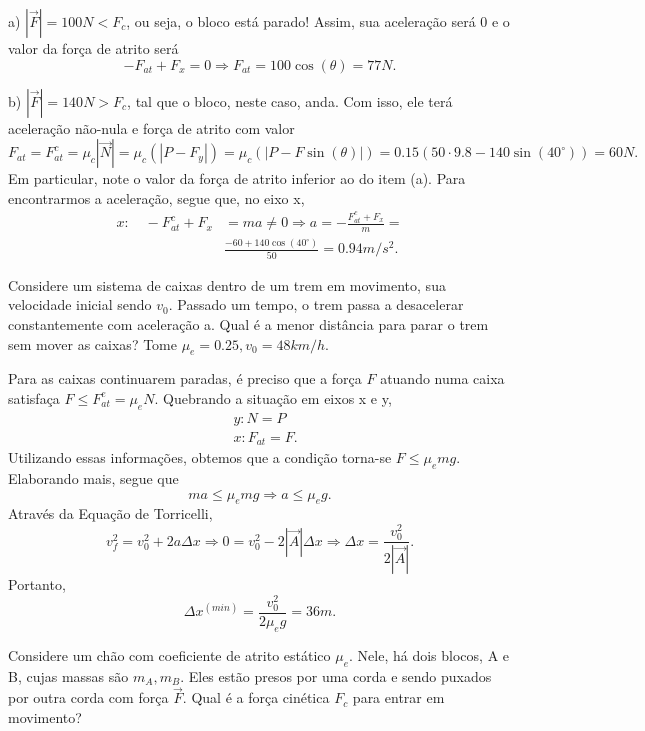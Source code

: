 \documentclass[PhysicsI/physics_notes.tex]{subfiles}
\begin{document}
\begin{example}
	a) $|\vec{F}|= 100N < F_{c}$, ou seja, o bloco está parado! Assim, sua aceleração será 0 e o valor da força de atrito será
	$$
		-F_{at} + F_{x} = 0 \Rightarrow  F_{at} = 100\cos{(\theta )} = 77N.
	$$

	b) $|\vec{F}| = 140N > F_{c}$, tal que o bloco, neste caso, anda. Com isso, ele terá aceleração não-nula e força de atrito com valor
	$$
		F_{at} = F_{at}^{c} = \mu_{c}|\vec{N}| = \mu_{c}(|P-F_{y}|) = \mu_{c}(|P-F\sin{(\theta )}|) = 0.15(50 \cdot 9.8 - 140\sin{(40^{\circ})}) = 60N.
	$$
	Em particular, note o valor da força de atrito inferior ao do item (a). Para encontrarmos a aceleração, segue que, no eixo x,
	\begin{align*}
		x:\quad -F_{at}^{c} + F_{x} & = ma\neq0 \Rightarrow a = -\frac{F_{at}^{c}+F_{x}}{m} = \\
		                            & \frac{-60+140\cos{(40^{\circ})}}{50} = 0.94m/s^{2}.
	\end{align*}

	\begin{example}
		Considere um sistema de caixas dentro de um trem em movimento, sua velocidade inicial sendo $v_{0}$. Passado um tempo,
		o trem passa a desacelerar constantemente com aceleração a. Qual é a menor distância para parar o trem sem mover as caixas? Tome
		$\mu_{e}=0.25, v_{0}=48km/h.$

		Para as caixas continuarem paradas, é preciso que a força $F$ atuando numa caixa satisfaça $F\leq F_{at}^{e} = \mu_{e}N$.
		Quebrando a situação em eixos x e y,
		\begin{align*}
			 & y: N = P       \\
			 & x: F_{at} = F.
		\end{align*}
		Utilizando essas informações, obtemos que a condição torna-se $F\leq \mu_{e}mg.$ Elaborando mais, segue que
		$$
			ma\leq \mu_{e}mg \Rightarrow  a\leq \mu_{e}g.
		$$
		Através da Equação de Torricelli,
		$$
			v_{f}^{2} = v_{0}^{2} + 2a\Delta x \Rightarrow 0 = v_{0}^{2} - 2|\vec{A}|\Delta x \Rightarrow \Delta x = \frac{v_{0}^{2}}{2|\vec{A}|}.
		$$
		Portanto,
		$$
			\Delta x^{(min)} = \frac{v_{0}^{2}}{2\mu_{e}g} = 36m.
		$$
	\end{example}
	\begin{example}
		Considere um chão com coeficiente de atrito estático $\mu_{e}.$ Nele, há dois blocos, A e B, cujas massas são
		$m_{A}, m_{B}$. Eles estão presos por uma corda e sendo puxados por outra corda com força $\vec{F}.$ Qual é a força
		cinética $F_{c}$ para entrar em movimento?
		\begin{center}
			\begin{tikzpicture}[scale=1, transform shape]


\end{tikzpicture}
\end{center}
\end{example}
\end{example}
\end{document}
